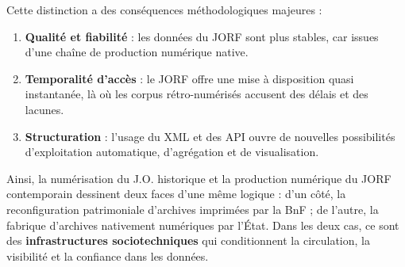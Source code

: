 Cette distinction a des conséquences méthodologiques majeures :

\begin{enumerate}
\item \textbf{Qualité et fiabilité} : les données du JORF sont plus stables, car issues d’une chaîne de production numérique native.
\item \textbf{Temporalité d’accès} : le JORF offre une mise à disposition quasi instantanée, là où les corpus rétro-numérisés accusent des délais et des lacunes.
\item \textbf{Structuration} : l’usage du XML et des API ouvre de nouvelles possibilités d’exploitation automatique, d’agrégation et de visualisation.

\end{enumerate}
Ainsi, la numérisation du J.O. historique et la production numérique du JORF contemporain dessinent deux faces d’une même logique : d’un côté, la reconfiguration patrimoniale d’archives imprimées par la BnF ; de l’autre, la fabrique d’archives nativement numériques par l’État. Dans les deux cas, ce sont des \textbf{infrastructures sociotechniques} qui conditionnent la circulation, la visibilité et la confiance dans les données.
